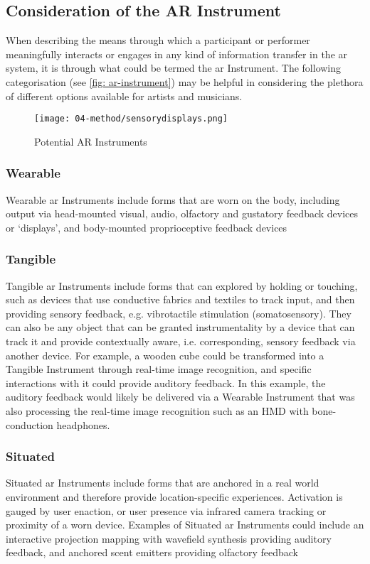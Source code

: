 \subsection{Consideration of the AR Instrument}\label{sec: discussion-patterns-instrument}
When describing the means through which a participant or performer meaningfully interacts or engages in any kind of information transfer in the \gls{ar} system, it is through what could be termed the \gls{ar} Instrument. The following categorisation (see \autoref{fig: ar-instrument}) may be helpful in considering the plethora of different options available for artists and musicians.
\begin{figure}
    \centering
    {\texttt{[image: 04-method/sensorydisplays.png]}}
    \caption[Potential AR Instruments]{Potential AR Instruments}
\end{figure}\label{fig: ar-instrument}

\subsubsection{Wearable}
Wearable \gls{ar} Instruments include forms that are worn on the body, including output via head-mounted visual, audio, olfactory and gustatory feedback devices or `displays', and body-mounted proprioceptive feedback devices

\subsubsection{Tangible}
Tangible \gls{ar} Instruments include forms that can explored by holding or touching, such as devices that use conductive fabrics and textiles to track input, and then providing sensory feedback, e.g. vibrotactile stimulation (somatosensory). They can also be any object that can be granted instrumentality by a device that can track it and provide contextually aware, i.e. corresponding, sensory feedback via another device. For example, a wooden cube could be transformed into a Tangible Instrument through real-time image recognition, and specific interactions with it could provide auditory feedback. In this example, the auditory feedback would likely be delivered via a Wearable Instrument that was also processing the real-time image recognition such as an HMD with bone-conduction headphones.

\subsubsection{Situated}
Situated \gls{ar} Instruments include forms that are anchored in a real world environment and therefore provide location-specific experiences. Activation is gauged by user enaction, or user presence via infrared camera tracking or proximity of a worn device. Examples of Situated \gls{ar} Instruments could include an interactive projection mapping with wavefield synthesis providing auditory feedback, and anchored scent emitters providing olfactory feedback

